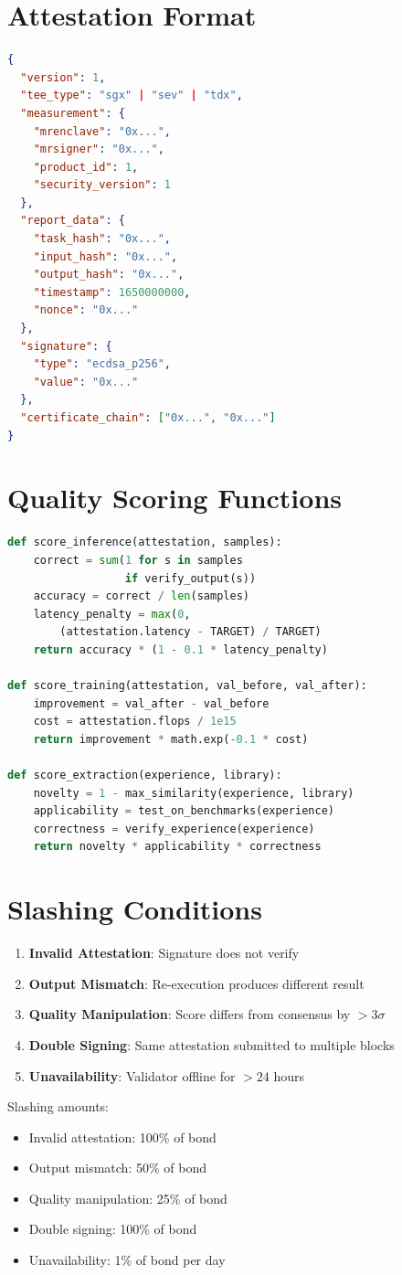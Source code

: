 \documentclass[11pt,letterpaper]{article}
\begin{document}
\appendix

\section{Attestation Format}

\begin{lstlisting}[language=json,caption=TEE Attestation Structure]
{
  "version": 1,
  "tee_type": "sgx" | "sev" | "tdx",
  "measurement": {
    "mrenclave": "0x...",
    "mrsigner": "0x...",
    "product_id": 1,
    "security_version": 1
  },
  "report_data": {
    "task_hash": "0x...",
    "input_hash": "0x...",
    "output_hash": "0x...",
    "timestamp": 1650000000,
    "nonce": "0x..."
  },
  "signature": {
    "type": "ecdsa_p256",
    "value": "0x..."
  },
  "certificate_chain": ["0x...", "0x..."]
}
\end{lstlisting}

\section{Quality Scoring Functions}

\begin{lstlisting}[language=python,caption=Quality Scoring Implementation]
def score_inference(attestation, samples):
    correct = sum(1 for s in samples
                  if verify_output(s))
    accuracy = correct / len(samples)
    latency_penalty = max(0,
        (attestation.latency - TARGET) / TARGET)
    return accuracy * (1 - 0.1 * latency_penalty)

def score_training(attestation, val_before, val_after):
    improvement = val_after - val_before
    cost = attestation.flops / 1e15
    return improvement * math.exp(-0.1 * cost)

def score_extraction(experience, library):
    novelty = 1 - max_similarity(experience, library)
    applicability = test_on_benchmarks(experience)
    correctness = verify_experience(experience)
    return novelty * applicability * correctness
\end{lstlisting}

\section{Slashing Conditions}

\begin{enumerate}
    \item \textbf{Invalid Attestation}: Signature does not verify
    \item \textbf{Output Mismatch}: Re-execution produces different result
    \item \textbf{Quality Manipulation}: Score differs from consensus by $> 3\sigma$
    \item \textbf{Double Signing}: Same attestation submitted to multiple blocks
    \item \textbf{Unavailability}: Validator offline for $> 24$ hours
\end{enumerate}

Slashing amounts:
\begin{itemize}
    \item Invalid attestation: 100\% of bond
    \item Output mismatch: 50\% of bond
    \item Quality manipulation: 25\% of bond
    \item Double signing: 100\% of bond
    \item Unavailability: 1\% of bond per day
\end{itemize}
\end{document}
